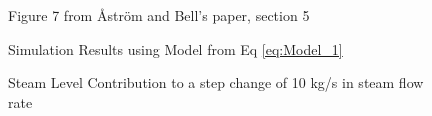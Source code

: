         \begin{figure}[ht]
            \begin{center}
                
                Figure 7 from \r{A}str\"{o}m and Bell's paper, section 5 \cite{Astrom}
                
                
                Simulation Results using Model from Eq \eqref{eq:Model_1}
                
                \caption{Steam Level Contribution to a step change of 10 kg/s in steam flow rate}
                \label{fig:Fig7C}
            \end{center}
        \end{figure}  %
        
